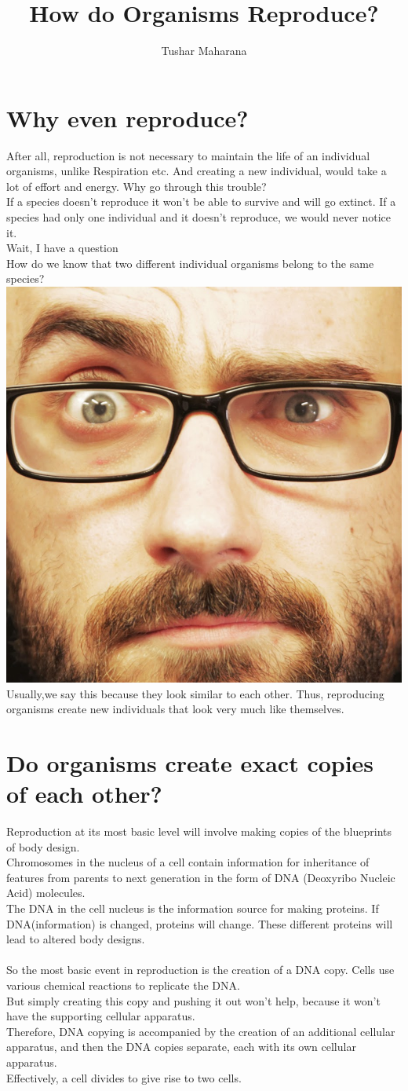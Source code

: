 \documentclass[A4]{article}
\title{How do Organisms Reproduce?}
\author{Tushar Maharana}
\newcommand{\vsauce}{\includegraphics[scale=0.015]{vsauce-eyes.jpg}}
\begin{document}
    \maketitle
    \tableofcontents
    \section{Why even reproduce?}
    After all, reproduction is not necessary to maintain the life of an individual organisms, unlike Respiration etc.
    And creating a new individual, would take a lot of effort and energy. Why go through this trouble?
    \\
    If a species doesn't reproduce it won't be able to survive and will go extinct. If a species had only one individual and it doesn't reproduce, we would never notice it.
    \\ Wait, I have a question \\
    How do we know that two different individual organisms belong to the same species?
    \vsauce \\
    Usually,we say this because they look similar to each other.
    Thus, reproducing organisms create new individuals that look very much like themselves.
    \section{Do organisms create exact copies of each other?}
    Reproduction at its most basic level will involve making copies of the blueprints of body design. \\
    Chromosomes in the nucleus of a cell contain information for inheritance of features from parents to next generation in the form of DNA (Deoxyribo Nucleic Acid) molecules.\\
    The DNA in the cell nucleus is the information source for making proteins. If DNA(information) is changed, proteins will change. These different proteins will lead to altered body designs.\\
    \paragraph{}
    So the most basic event in reproduction is the creation of a DNA copy. Cells use various chemical reactions to replicate the DNA.\\
    But simply creating this copy and pushing it out won't help, because it won't have the supporting cellular apparatus. \\
    Therefore, DNA copying is accompanied by the creation of an additional cellular apparatus, and then the DNA copies separate, each with its own cellular apparatus. \\
    Effectively, a cell divides to give rise to two cells.
\end{document}
